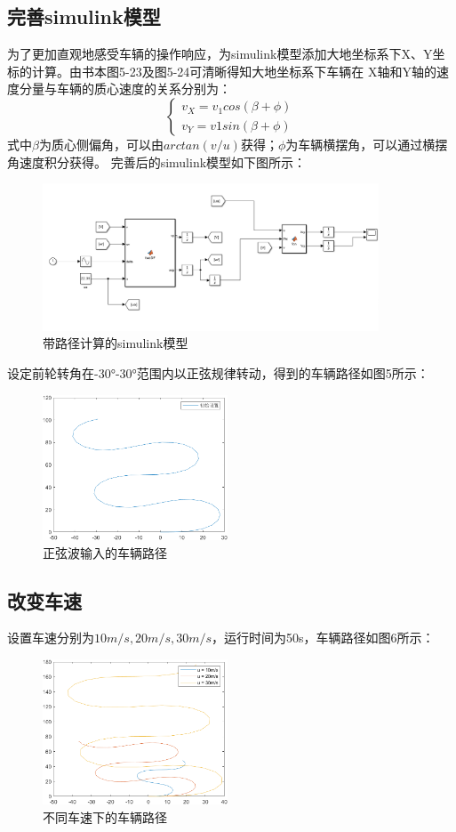 \subsection{完善simulink模型}

为了更加直观地感受车辆的操作响应，为simulink模型添加大地坐标系下X、Y坐标的计算。由书本图5-23及图5-24可清晰得知大地坐标系下车辆在
X轴和Y轴的速度分量与车辆的质心速度的关系分别为：
$$
\begin{cases}
    v_X = v_1 cos(\beta+\phi)\\
    v_Y = v1 sin(\beta+\phi)
\end{cases}
$$
式中$\beta$为质心侧偏角，可以由$arctan(v/u)$获得；$\phi$为车辆横摆角，可以通过横摆角速度积分获得。
完善后的simulink模型如下图所示：

\begin{figure}[h]
    \centering
    \includegraphics[width=10cm]{figure/final.png}
    \caption{带路径计算的simulink模型}
    \label{simulinkFinal}
\end{figure}

设定前轮转角在-30°-30°范围内以正弦规律转动，得到的车辆路径如图5所示：

\begin{figure}[htbp]
    \centering
    \includegraphics[width=5.5cm]{figure/origin.png}
    \caption{正弦波输入的车辆路径}
    \label{originpath}
\end{figure}

\subsection{改变车速}
设置车速分别为$10m/s,20m/s,30m/s$，运行时间为50s，车辆路径如图6所示：
\begin{figure}[htbp]
    \centering
    \includegraphics[width=5.5cm]{figure/velocity.png}
    \caption{不同车速下的车辆路径}
    \label{velocity}
\end{figure}

